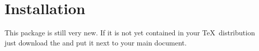 
\section{Installation}
\label{installation}

This package is still very new.
If it is not yet contained in your \TeX\ distribution
just download the  and put it next to your main document.
